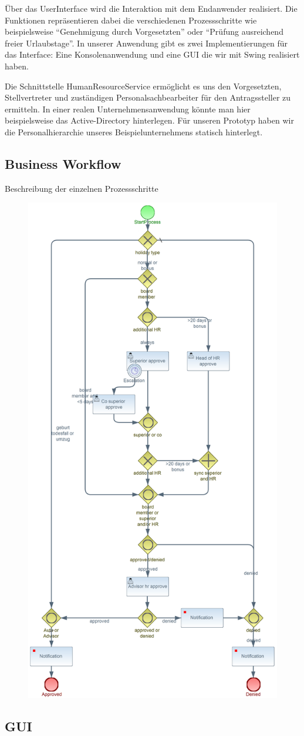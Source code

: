 Über das UserInterface wird die Interaktion mit dem Endanwender realisiert. Die Funktionen repräsentieren dabei die verschiedenen Prozessschritte wie beispielsweise "`Genehmigung durch Vorgesetzten"' oder "`Prüfung ausreichend freier Urlaubstage"'. In unserer Anwendung gibt es zwei Implementierungen für das Interface: Eine Konsolenanwendung und eine GUI die wir mit Swing realisiert haben.

Die Schnittstelle HumanResourceService ermöglicht es uns den Vorgesetzten, Stellvertreter und zuständigen Personalsachbearbeiter für den Antragssteller zu ermitteln. In einer realen Unternehmensanwendung könnte man hier beispielsweise das Active-Directory hinterlegen. Für unseren Prototyp haben wir die Personalhierarchie unseres Beispielunternehmens statisch hinterlegt.

\subsection{Business Workflow}

Beschreibung der einzelnen Prozessschritte 

\begin{figure}[H]
\centering
\includegraphics[width=0.7\linewidth]{Bilder/Urlaubsantrag}
\caption{}
\label{fig:Urlaubsantrag}
\end{figure}


\subsection{GUI}